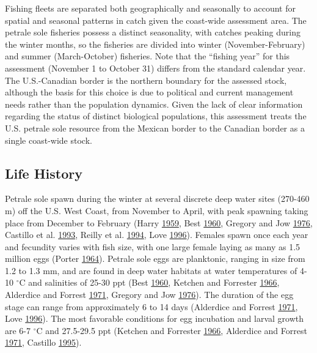 \documentclass[12pt,]{article}
\begin{document}
Fishing fleets are separated both geographically and seasonally to
account for spatial and seasonal patterns in catch given the coast-wide
assessment area. The petrale sole fisheries possess a distinct
seasonality, with catches peaking during the winter months, so the
fisheries are divided into winter (November-February) and summer
(March-October) fisheries. Note that the ``fishing year'' for this
assessment (November 1 to October 31) differs from the standard calendar
year. The U.S.-Canadian border is the northern boundary for the assessed
stock, although the basis for this choice is due to political and
current management needs rather than the population dynamics. Given the
lack of clear information regarding the status of distinct biological
populations, this assessment treats the U.S. petrale sole resource from
the Mexican border to the Canadian border as a single coast-wide stock.

\subsection{Life History}\label{life-history}

Petrale sole spawn during the winter at several discrete deep water
sites (270-460 m) off the U.S. West Coast, from November to April, with
peak spawning taking place from December to February (Harry
\protect\hyperlink{ref-harry_time_1959}{1959}, Best
\protect\hyperlink{ref-best_petrale_1960}{1960}, Gregory and Jow
\protect\hyperlink{ref-gregory_validity_1976}{1976}, Castillo et al.
\protect\hyperlink{ref-castillo_g.c._environmental_1993}{1993}, Reilly
et al. \protect\hyperlink{ref-reilly_recreational_1994}{1994}, Love
\protect\hyperlink{ref-love_milton_probably_1996}{1996}). Females spawn
once each year and fecundity varies with fish size, with one large
female laying as many as 1.5 million eggs (Porter
\protect\hyperlink{ref-porter_notes_1964}{1964}). Petrale sole eggs are
planktonic, ranging in size from 1.2 to 1.3 mm, and are found in deep
water habitats at water temperatures of 4-10 \(^\circ\)C and salinities
of 25-30 ppt (Best \protect\hyperlink{ref-best_petrale_1960}{1960},
Ketchen and Forrester
\protect\hyperlink{ref-ketchen_population_1966}{1966}, Alderdice and
Forrest \protect\hyperlink{ref-alderdice_effects_1971}{1971}, Gregory
and Jow \protect\hyperlink{ref-gregory_validity_1976}{1976}). The
duration of the egg stage can range from approximately 6 to 14 days
(Alderdice and Forrest
\protect\hyperlink{ref-alderdice_effects_1971}{1971}, Love
\protect\hyperlink{ref-love_milton_probably_1996}{1996}). The most
favorable conditions for egg incubation and larval growth are 6-7
\(^\circ\)C and 27.5-29.5 ppt (Ketchen and Forrester
\protect\hyperlink{ref-ketchen_population_1966}{1966}, Alderdice and
Forrest \protect\hyperlink{ref-alderdice_effects_1971}{1971}, Castillo
\protect\hyperlink{ref-castillo_latitudinal_1995}{1995}).
\end{document}
